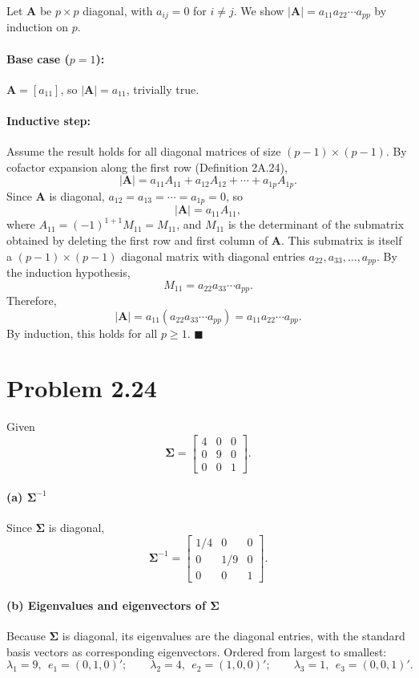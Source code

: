 \documentclass[11pt]{article}
\newcommand{\bA}{\mathbf{A}}
\newcommand{\bSigma}{\boldsymbol{\Sigma}}
\begin{document}
Let $\bA$ be $p\times p$ diagonal, with $a_{ij}=0$ for $i\neq j$. We show $|\bA| = a_{11}a_{22}\cdots a_{pp}$ by induction on $p$.

\paragraph{Base case ($p=1$):} $\bA = [a_{11}]$, so $|\bA| = a_{11}$, trivially true.

\paragraph{Inductive step:} Assume the result holds for all diagonal matrices of size $(p-1)\times(p-1)$. By cofactor expansion along the first row (Definition 2A.24),
\[
|\bA| = a_{11}A_{11} + a_{12}A_{12} + \cdots + a_{1p}A_{1p}.
\]
Since $\bA$ is diagonal, $a_{12}=a_{13}=\cdots=a_{1p}=0$, so
\[
|\bA| = a_{11}A_{11},
\]
where $A_{11} = (-1)^{1+1}M_{11} = M_{11}$, and $M_{11}$ is the determinant of the submatrix obtained by deleting the first row and first column of $\bA$. This submatrix is itself a $(p-1)\times(p-1)$ diagonal matrix with diagonal entries $a_{22}, a_{33},\dots,a_{pp}$. By the induction hypothesis,
\[
M_{11} = a_{22}a_{33}\cdots a_{pp}.
\]
Therefore,
\[
|\bA| = a_{11}(a_{22}a_{33}\cdots a_{pp}) = a_{11}a_{22}\cdots a_{pp}.
\]
By induction, this holds for all $p \geq 1$. $\blacksquare$

\section*{Problem 2.24}

Given
\[
\bSigma = \begin{bmatrix} 4 & 0 & 0 \\ 0 & 9 & 0 \\ 0 & 0 & 1 \end{bmatrix}.
\]

\paragraph{(a) $\bSigma^{-1}$}
Since $\bSigma$ is diagonal,
\[
\bSigma^{-1} = \begin{bmatrix} 1/4 & 0 & 0 \\ 0 & 1/9 & 0 \\ 0 & 0 & 1 \end{bmatrix}.
\]

\paragraph{(b) Eigenvalues and eigenvectors of $\bSigma$}
Because $\bSigma$ is diagonal, its eigenvalues are the diagonal entries, with the standard basis vectors as corresponding eigenvectors. Ordered from largest to smallest:
\[
\lambda_1 = 9,\ \ e_1 = (0,1,0)'; \qquad
\lambda_2 = 4,\ \ e_2 = (1,0,0)'; \qquad
\lambda_3 = 1,\ \ e_3 = (0,0,1)'.
\]
\end{document}
